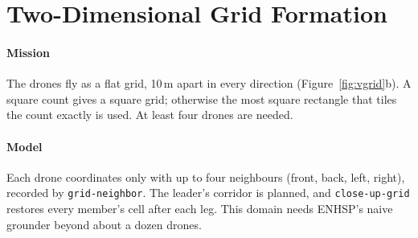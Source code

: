 \documentclass[11pt,a4paper,oneside]{report}
\newcommand{\code}[1]{\texttt{#1}}
\begin{document}
\section{Two-Dimensional Grid Formation}
\paragraph{Mission}
The drones fly as a flat grid, 10\,m apart in every direction (Figure~\ref{fig:vgrid}b). A square
count gives a square grid; otherwise the most square rectangle that tiles the count exactly is
used. At least four drones are needed.

\paragraph{Model}
Each drone coordinates only with up to four neighbours (front, back, left, right), recorded by
\code{grid-neighbor}. The leader's corridor is planned, and \code{close-up-grid} restores every
member's cell after each leg. This domain needs ENHSP's naive grounder beyond about a dozen
drones.
\end{document}
